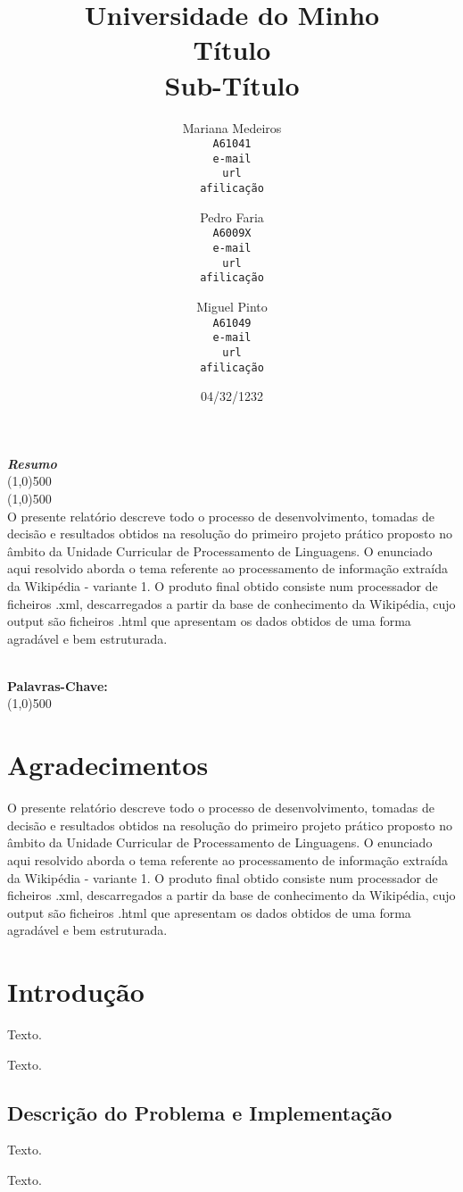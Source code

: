 \documentclass[12pt,letterpaper]{article}
\author{
Mariana Medeiros\\ \texttt{A61041}\\ \texttt{e-mail}\\ \texttt{url}\\ \texttt{afilicação}\\
  \and
Pedro Faria\\ \texttt{A6009X}\\ \texttt{e-mail}\\ \texttt{url}\\ \texttt{afilicação}\\
  \and
Miguel Pinto\\ \texttt{A61049}\\ \texttt{e-mail}\\ \texttt{url}\\ \texttt{afilicação}
  \vspace*{2.0in}
}
\title{ Universidade do Minho\\
    \vspace*{0.60in}
    Título\\
    {\small Sub-Título}
    \vspace*{1.55in}}
\date{04/32/1232}
\makeatletter
\newenvironment{resumo}
{	
	\begin{center}
	\begin{minipage}[t]{500 pt}
	\vspace{5mm}
	\emph{\textbf{Resumo}}
	\\[-2mm]
	\line(1,0){500}
	\\[-4.25 mm]
	\line(1,0){500}
	\\
}
{
	\normalsize
	\\[2mm]
	\footnotesize\textbf{Palavras-Chave: \footnotesize\@palabras}
	\\[-2mm]
	\line(1,0){500}
	\\[0.5cm]
	\end{minipage}
	\end{center}
}
\makeatother
\begin{document}
\maketitle	

\newpage
\tableofcontents

\newpage
\listoffigures

\newpage
\listoftables

\newpage
\begin{resumo}
O presente relatório descreve todo o processo de desenvolvimento, tomadas de decisão e resultados obtidos na resolução do primeiro projeto prático proposto no âmbito da Unidade Curricular de Processamento de Linguagens.
O enunciado aqui resolvido aborda o tema referente ao processamento de informação extraída da Wikipédia - variante 1. O produto final obtido consiste num processador de ficheiros .xml, descarregados a partir da base de conhecimento da Wikipédia, cujo output são ficheiros .html que apresentam os dados obtidos de uma forma agradável e bem estruturada.
\end{resumo}


\newpage
\section{Agradecimentos}
O presente relatório descreve todo o processo de desenvolvimento, tomadas de decisão e resultados obtidos na resolução do primeiro projeto prático proposto no âmbito da Unidade Curricular de Processamento de Linguagens.
O enunciado aqui resolvido aborda o tema referente ao processamento de informação extraída da Wikipédia - variante 1. O produto final obtido consiste num processador de ficheiros .xml, descarregados a partir da base de conhecimento da Wikipédia, cujo output são ficheiros .html que apresentam os dados obtidos de uma forma agradável e bem estruturada.


\newpage
\section{Introdução}
\par Texto.
\par Texto.


\subsection{Descrição do Problema e Implementação}
\par Texto.
\par Texto.
\end{document}
